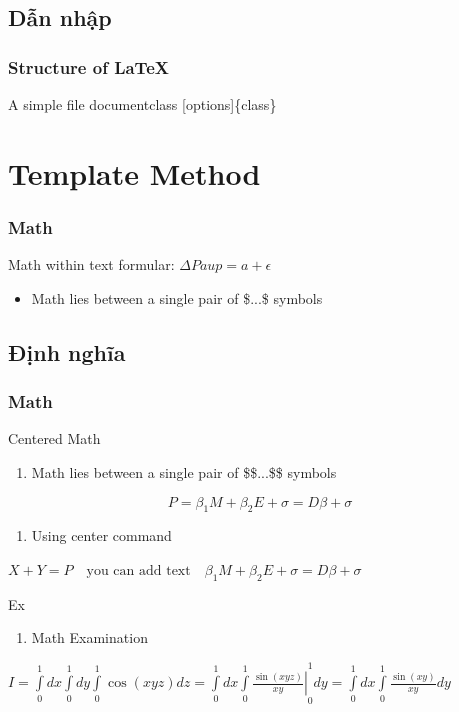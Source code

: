 \documentclass[english,10pt,table]{beamer}
\begin{document}
\subsection{Dẫn nhập}
\frame
{
	\frametitle{Structure of \LaTeX{}}
	\begin{block}{A simple file }
		documentclass [options]\{class\}	
	 
	\end{block}
}
\section{Template Method}
\frame
{
	\frametitle{Math}
	\begin{block}{Math within text}	
			formular: $\Delta{Paup} = a +\epsilon$
			\begin{itemize}
			\item Math lies between a single pair of \$...\$ symbols 
		\end{itemize}
		
	\end{block}
}
\subsection{Định nghĩa}
\frame
{
	\frametitle{Math}
	\begin{block}{Centered Math}	
		\begin{enumerate}[1]
			\item Math lies between a single pair of \$\$...\$\$ symbols 
		\end{enumerate}
		$$ P = \beta_{1} M + \beta_{2} E + \sigma = D \beta + \sigma $$
		\begin{enumerate}[2]
			\item Using center command
		\end{enumerate}
		\begin{center}
			$ X + Y = P \quad \text{you can add text} \quad \beta_{1} M + \beta_{2} E + \sigma = D \beta + \sigma $
		\end{center}
	\end{block}
	\begin{block}{Ex}
	    \begin{enumerate}
	        \item Math Examination
	    \end{enumerate}
	    $I = \int\limits_0^1 {dx\int\limits_0^1 {dy\int\limits_0^1 {\cos (xyz)dz = \int\limits_0^1 {dx\int\limits_0^1 {\left. {\frac{{\sin (xyz)}}{{xy}}} \right|} } } } } _0^1dy = \int\limits_0^1 {dx\int\limits_0^1 {\frac{{\sin (xy)}}{{xy}}} } dy$
	\end{block}
}
\end{document}
